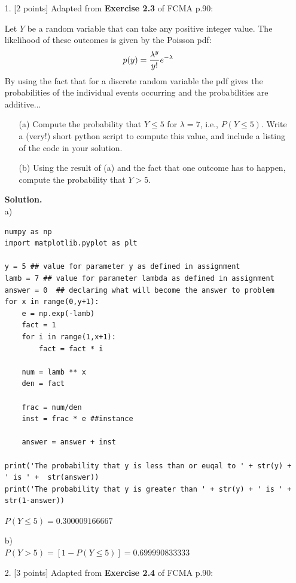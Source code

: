 \documentclass[10pt]{article}
\begin{document}
\newpage
\begin{itemize}

\item[1.] [2 points]
Adapted from {\bf Exercise 2.3} of FCMA p.90:

Let $Y$ be a random variable that can take any positive integer value.  The likelihood of these outcomes is given by the Poisson pdf:
\begin{eqnarray}
p(y) = {\lambda^y\over y!} e^{-\lambda}
\end{eqnarray}
By using the fact that for a discrete random variable the pdf gives the probabilities of the individual events occurring and the probabilities are additive...
\begin{enumerate}
\item[(a)] Compute the probability that $Y \leq 5$ for $\lambda = 7$, i.e., $P(Y \leq 5)$.  Write a (very!) short python script to compute this value, and include a listing of the code in your solution.
\item[(b)] Using the result of (a) and the fact that one outcome has to happen, compute the probability that $Y > 5$.
\end{enumerate}

{\bf Solution.} 
\\a)
\begin{verbatim}
numpy as np
import matplotlib.pyplot as plt

y = 5 ## value for parameter y as defined in assignment
lamb = 7 ## value for parameter lambda as defined in assignment
answer = 0  ## declaring what will become the answer to problem
for x in range(0,y+1):
    e = np.exp(-lamb)
    fact = 1
    for i in range(1,x+1):
        fact = fact * i

    num = lamb ** x
    den = fact

    frac = num/den
    inst = frac * e ##instance

    answer = answer + inst

print('The probability that y is less than or euqal to ' + str(y) + ' is ' +  str(answer))
print('The probability that y is greater than ' + str(y) + ' is ' + str(1-answer))

\end{verbatim}


 $P(Y \le 5) = 0.300009166667$
 
 b)
 \\$P(Y  > 5) = [1-P(Y \le 5)]= 0.699990833333$


\item[2.] [3 points]
Adapted from {\bf Exercise 2.4} of FCMA p.90:


\end{itemize}
\end{document}
